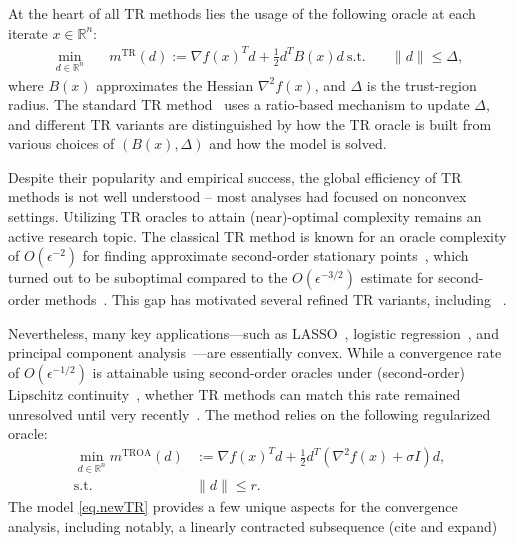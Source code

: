 \documentclass{mcom-l}
\numberwithin{equation}{section}
\begin{document}
At the heart of all TR methods lies the usage of the following oracle at each iterate $x \in \mathbb{R}^n$:
\begin{equation}
    \label{eq.classic tr subproblem}
    \begin{aligned}
        \min_{d \in \mathbb{R}^n} \quad & m^{\text{TR}}(d) := \nabla f(x)^T d + \tfrac{1}{2} d^T B(x) d \
        \text{s.t.} \quad               & \|d\| \le \Delta,
    \end{aligned}
\end{equation}
where $B(x)$ approximates the Hessian $\nabla^2 f(x)$, and $\Delta$ is the trust-region radius. The standard TR method~\cite{conn2000trust} uses a ratio-based mechanism to update $\Delta$, and different TR variants are distinguished by how the TR oracle is built from various choices of $(B(x),\Delta)$ and how the model is solved.

Despite their popularity and empirical success, the global efficiency of TR methods is not well understood -- most analyses had focused on nonconvex settings.  Utilizing TR oracles to attain (near)-optimal complexity remains an active research topic. The classical TR method is known for an oracle complexity of $O(\epsilon^{-2})$ for finding approximate second-order stationary points~\cite{conn2000trust,nocedal1999numerical,cartisComplexitySteepestDescent2010,cartisComplexityBoundsSecondorder2012}, which turned out to be suboptimal compared to the $O(\epsilon^{-3/2})$ estimate for second-order methods~\cite{nesterov2006cubic,carmon2021lower}. This gap has motivated several refined TR variants, including ~\cite{yeSecondOrderOptimization2005,curtis2017trust,curtis2021trust,zhangHomogeneousSecondorderDescent2025,heHomogeneousSecondorderDescent2025}.

Nevertheless, many key applications—such as LASSO~\cite{ranstam2018lasso}, logistic regression~\cite{lavalley2008logistic}, and principal component analysis~\cite{abdi2010principal}—are essentially convex. While a convergence rate of $O(\epsilon^{-1/2})$ is attainable using second-order oracles under (second-order) Lipschitz continuity~\cite{nesterov2006cubic,nesterov2008accelerating,mishchenko_regularized_2023,arjevaniOracleComplexitySecondorder2019}, whether TR methods can match this rate remained unresolved until very recently~\cite{jiang2024nonconvexityuniversaltrustregionmethod}. The method relies on the following regularized oracle:
\begin{subequations}\label{eq.newTR}
    \begin{align}
        \min_{d \in \mathbb{R}^n} m^{\text{TROA}}(d) & :=\nabla f(x)^T d + \tfrac{1}{2}d^T (\nabla^2 f(x) + \sigma I) d, \\\label{eq.sa.ballconstraint} \operatorname{s.t.} ~& \|d\| \le r.
    \end{align}
\end{subequations}
The model \eqref{eq.newTR} provides a few unique aspects for the convergence analysis, including notably, a linearly contracted subsequence {\color{red}(cite and expand)}
\end{document}
